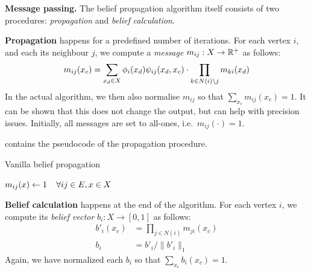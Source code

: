 \documentclass[letterpaper]{article}
\newcommand{\mypar}[1]{{\bf #1.}}
\newcommand{\myparcont}[1]{{\bf #1}}
\begin{document}

\mypar{Message passing} The belief propagation algorithm itself consists of two
procedures: \emph{propagation} and \emph{belief calculation}.

\myparcont{Propagation} happens for a predefined number of iterations. For each vertex $i$, and each its neighbour $j$, we compute a \emph{message} $m_{ij} : X \to \mathbb{R}^+$ as follows:
%
$$m_{ij}(x_c) = \sum_{x_d \in X} \phi_i(x_d)\psi_{ij}(x_d, x_c) \cdot \prod_{k \in N(i) \setminus j} m_{ki}(x_d)$$
%
In the actual algorithm, we then also normalise $m_{ij}$ so that $\sum_{x_c}
m_{ij}(x_c) = 1$. It can be shown that this does not change the output, but can
help with precision issues. Initially, all messages are set to all-ones,
i.e.~$m_{ij}(\cdot) = 1$.

 contains the pseudocode of the propagation procedure.

\begin{algorithm}
\caption{Vanilla belief propagation}
\label{algo:propagate}
\algodefaults
	$m_{ij}(x) \leftarrow 1\mkern 20mu\forall ij \in E, x \in X$\;
\end{algorithm}

\myparcont{Belief calculation} happens at the end of the algorithm. For each
vertex $i$, we compute its \emph{belief vector} $b_i: X \to [0, 1]$ as follows:
%
\begin{align*}
	b'_i(x_c) &= \prod_{j \in N(i)} m_{ji}(x_c) \\
	b_i &= b'_{i} / \|b'_i\|_1
\end{align*}
%
Again, we have normalized each $b_i$ so that $\sum_{x_c} b_i(x_c) = 1$.
\end{document}

